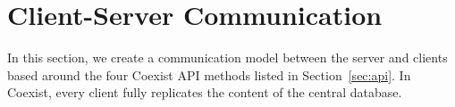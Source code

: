 
\section{Client-Server Communication} \label{sec:communication}

In this section, we create a communication model between the server and clients
based around the four Coexist API methods listed in Section~\ref{sec:api}. In
Coexist, every client fully replicates the content of the central database.







